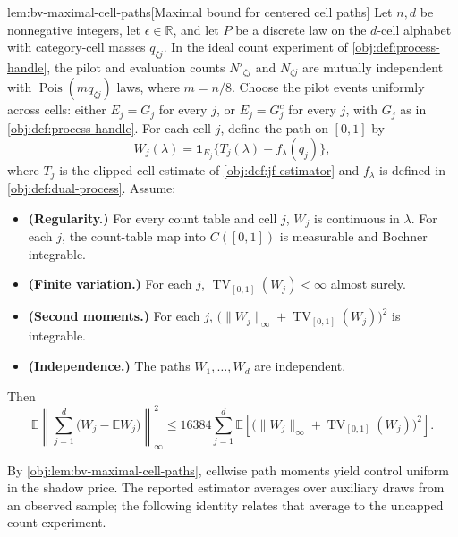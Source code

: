 \begin{lemmav}{lem:bv-maximal-cell-paths}[Maximal bound for centered cell paths]
Let \(n,d\) be nonnegative integers, let \(\epsilon\in\mathbb R\), and let \(P\) be a discrete law on the \(d\)-cell alphabet with category-cell masses \(q_{\zeta j}\). In the ideal count experiment of \cref{obj:def:process-handle}, the pilot and evaluation counts \(N'_{\zeta j}\) and \(N_{\zeta j}\) are mutually independent with \(\operatorname{Pois}(mq_{\zeta j})\) laws, where \(m=n/8\). Choose the pilot events uniformly across cells: either \(E_j=G_j\) for every \(j\), or \(E_j=G_j^c\) for every \(j\), with \(G_j\) as in \cref{obj:def:process-handle}. For each cell \(j\), define the path on \([0,1]\) by
\[
W_j(\lambda)=\mathbf 1_{E_j}\bigl\{T_j(\lambda)-f_\lambda(q_j)\bigr\},
\]
where \(T_j\) is the clipped cell estimate of \cref{obj:def:jf-estimator} and \(f_\lambda\) is defined in \cref{obj:def:dual-process}. Assume:

\begin{itemize}
\item \textbf{(Regularity.)} For every count table and cell \(j\), \(W_j\) is continuous in \(\lambda\). For each \(j\), the count-table map into \(C([0,1])\) is measurable and Bochner integrable.
\item \textbf{(Finite variation.)} For each \(j\), \(\operatorname{TV}_{[0,1]}(W_j)<\infty\) almost surely.
\item \textbf{(Second moments.)} For each \(j\), \(\bigl(\|W_j\|_\infty+\operatorname{TV}_{[0,1]}(W_j)\bigr)^2\) is integrable.
\item \textbf{(Independence.)} The paths \(W_1,\ldots,W_d\) are independent.
\end{itemize}

Then
\[
\mathbb E\left\|\sum_{j=1}^{d}\bigl(W_j-\mathbb EW_j\bigr)\right\|_\infty^2
\leq 16384\sum_{j=1}^{d}
\mathbb E\left[\bigl(\|W_j\|_\infty+\operatorname{TV}_{[0,1]}(W_j)\bigr)^2\right].
\]
\end{lemmav}

By \cref{obj:lem:bv-maximal-cell-paths}, cellwise path moments yield control uniform in the shadow price. The reported estimator averages over auxiliary draws from an observed sample; the following identity relates that average to the uncapped count experiment.

